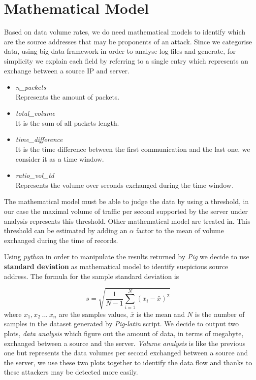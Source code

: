 \section{Mathematical Model}
\label{sec:mathmodel}
Based on data volume rates, we do need mathematical models to identify which are the source addresses that may be proponents of an attack. Since we categorise data, using big data framework in order to analyse log files and generate, for simplicity we explain each field by referring to a single entry which represents an exchange between a source IP and server.

\begin{itemize}
	\item \textit{n\_packets} \\ Represents the amount of packets.
	\item \textit{total\_volume} \\ It is the sum of all packets length.
	\item \textit{time\_difference} \\ It is the time difference between the first communication and the last one, we consider it as a time window.
	\item \textit{ratio\_vol\_td} \\ Represents the volume over seconds exchanged during the time window.
\end{itemize}

The mathematical model must be able to judge the data by using a threshold, in our case the maximal volume of traffic per second supported by the server under analysis represents this threshold. Other mathematical model are treated in\cite{detection_by_path_analaysis}. 
This threshold can be estimated by adding an $\alpha$ factor to the mean of volume exchanged during the time of records.

Using \textit{python} in order to manipulate the results returned by \textit{Pig} we decide to use \textbf{standard deviation} as mathematical model to identify suspicious source address.
The formula for the sample standard deviation is

\begin{equation}
\label{eq:standard_dev}
	s = \sqrt{\frac{1}{N-1}\sum_{i=1}^N(x_i - \bar{x})^2}
\end{equation}
where $x_1, x_2\ ...\ x_n$ are the samples values, $\bar{x}$ is the mean and $N$ is the number of samples in the dataset generated by \textit{Pig-latin} script. We decide to output two plots, \textit{data analysis} which figure out the amount of data, in terms of megabyte, exchanged between a source and the server. \textit{Volume analysis} is like the previous one but represents the data volumes per second exchanged between a source and the server, we use these two plots together to identify the data flow and thanks to these attackers may be detected more easily.
